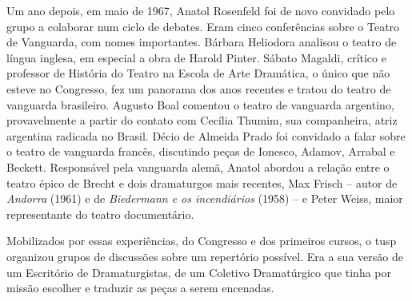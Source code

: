 
Um ano depois, em maio de 1967, Anatol Rosenfeld foi de novo convidado
pelo grupo a colaborar num ciclo de debates. Eram cinco conferências
sobre o Teatro de Vanguarda, com nomes importantes. Bárbara
Heliodora analisou o teatro de língua inglesa, em especial a obra de
Harold Pinter. Sábato Magaldi, crítico e professor de História do Teatro
na Escola de Arte Dramática, o único que não esteve no Congresso, fez um
panorama dos anos recentes e tratou do teatro de vanguarda
brasileiro. Augusto Boal comentou o teatro de vanguarda
argentino, provavelmente a partir do contato com Cecília Thumim, sua
companheira, atriz argentina radicada no Brasil. Décio de Almeida Prado
foi convidado a falar sobre o teatro de vanguarda francês,
discutindo peças de Ionesco, Adamov, Arrabal e Beckett. Responsável pela
vanguarda alemã, Anatol abordou a relação entre o teatro épico de Brecht
e dois dramaturgos mais recentes, Max Frisch -- autor de {\it Andorra} (1961) e
de {\it Biedermann e os incendiários} (1958) -- e Peter Weiss, maior
representante do teatro documentário.


Mobilizados por essas experiências, do Congresso e dos primeiros cursos,
o {\sc tusp} organizou grupos de discussões sobre um repertório possível. Era a
sua versão de um Escritório de Dramaturgistas, de um Coletivo
Dramatúrgico que tinha por missão escolher e traduzir as peças a serem
encenadas.

\subject{Formação do Coletivo Dramatúrgico e realização de leituras-cênicas}

